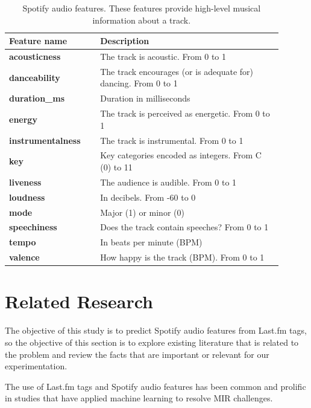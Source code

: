 \documentclass[sn-mathphys]{sn-jnl}%
\theoremstyle{thmstyleone}%
\theoremstyle{thmstyletwo}%
\theoremstyle{thmstylethree}%
\begin{document}
\begin{table}[h!]
      \centering
      \caption{Spotify audio features. These features provide high-level musical information about a track.} \label{table:spotify-features}
      \begin{tabular}{p{0.3\linewidth}p{0.6\linewidth}}
          \toprule
          \bfseries \textbf{Feature name} & \textbf{Description} \\
          \midrule
          \textbf{acousticness} & The track is acoustic. From 0 to 1 \\
          \textbf{danceability} & The track encourages (or is adequate for) dancing. From 0 to 1 \\
          \textbf{duration\_ms}  &  Duration in milliseconds \\
          \textbf{energy}  &  The track is perceived as energetic. From 0 to 1\\
          \textbf{instrumentalness}  &  The track is instrumental. From 0 to 1 \\
          \textbf{key}  &  Key categories encoded as integers. From C (0) to 11 \\
          \textbf{liveness}  &  The audience is audible. From 0 to 1\\
          \textbf{loudness}  &  In decibels. From -60 to 0 \\
          \textbf{mode}  & Major (1) or minor (0) \\
          \textbf{speechiness}  & Does the track contain speeches? From 0 to 1 \\
          \textbf{tempo}  & In beats per minute (BPM) \\
          \textbf{valence} & How happy is the track (BPM). From 0 to 1 \\
          \bottomrule
      \end{tabular}
  \end{table}


\section{Related Research}

The objective of this study is to predict Spotify audio features from Last.fm tags, so the objective of this section is to
explore existing literature that is related to the problem and review the facts that are important or relevant for our experimentation.

The use of Last.fm tags and Spotify audio features has been common and prolific in studies
that have applied machine learning to resolve MIR challenges.
\end{document}
